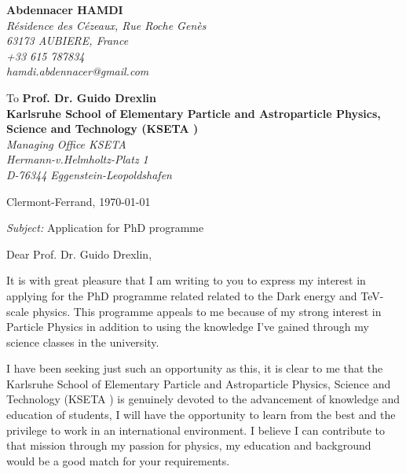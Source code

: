 \documentclass[11pt]{letter}
\begin{document}
 \sffamily
 \hfill
 \begin{flushleft}
 {\bfseries Abdennacer HAMDI}\\[.35ex]
 \small\itshape
 Résidence des Cézeaux, Rue Roche Genès\\
 63173 AUBIERE, France\\[.35ex]
 +33 615 787834\\
 hamdi.abdennacer@gmail.com
 \end{flushleft}
 \begin{flushleft}
 To {\bfseries Prof. Dr. Guido Drexlin \\ Karlsruhe School of Elementary Particle and Astroparticle Physics, Science and Technology (KSETA )}\\[.35ex]
 \small\itshape
 Managing Office KSETA \\
Hermann-v.Helmholtz-Platz 1 \\
D-76344 Eggenstein-Leopoldshafen

 \end{flushleft}
 \hfill
 \begin{flushleft}
 Clermont-Ferrand, \today \\
 
 \end{flushleft}
\textit{Subject:}  Application for PhD programme\\
\par Dear Prof. Dr. Guido Drexlin, 
~\par It is with great pleasure that I am writing to you to express my interest in applying for the PhD programme related  related to the Dark energy and TeV-scale physics. This programme appeals to me because of my strong interest in Particle Physics in addition to using the knowledge I’ve gained through my science classes in the university.
~\par I have been seeking just such an opportunity as this, it is clear to me that the Karlsruhe School of Elementary Particle and Astroparticle Physics, Science and Technology (KSETA ) is genuinely devoted to the advancement of knowledge and education of students, I will have the opportunity to learn from the best and the privilege to work in an international environment. I believe I can contribute to that mission through my passion for physics, my education and background would be a good match for your requirements.
\end{document}

